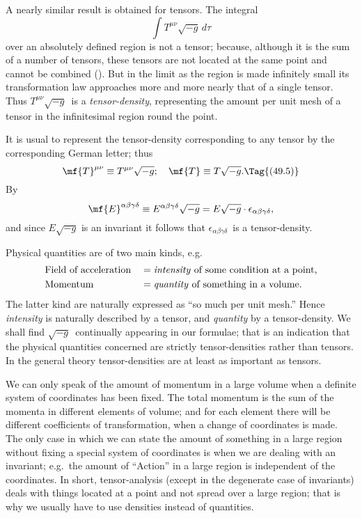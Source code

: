 \documentclass[12pt]{book}
\begin{document}
A nearly similar result is obtained for tensors. The integral
\[
\int T^{\mu\nu} \sqrt{-g}\, d\tau
\]
over an absolutely defined region is not a tensor; because, although it is the
sum of a number of tensors, these tensors are not located at the same point
and cannot be combined (). But in the limit as the region is made
infinitely small its transformation law approaches more and more nearly that
of a single tensor. Thus $T^{\mu\nu} \sqrt{-g}$~is a \emph{tensor-density}, representing the amount
%
per unit mesh of a tensor in the infinitesimal region round the point.

It is usual to represent the tensor-density corresponding to any tensor by
%
the corresponding German letter; thus
\[
\mf{T}^{\mu\nu} \equiv T^{\mu\nu} \sqrt{-g};\quad
\mf{T} \equiv T \sqrt{-g}.
\Tag{(49.5)}
\]
By 
\[
\mf{E}^{\alpha\beta\gamma\delta} \equiv E^{\alpha\beta\gamma\delta} \sqrt{-g}
= E \sqrt{-g} \cdot \epsilon_{\alpha\beta\gamma\delta},
\]
and since $E \sqrt{-g}$ is an invariant it follows that $\epsilon_{\alpha\beta\gamma\delta}$~is a tensor-density.

Physical quantities are of two main kinds, e.g.\
%
%
\begin{alignat*}{2}
  &\text{Field of acceleration}
  &&= \text{\emph{intensity} of some condition at a point,} \\
    &\text{Momentum}
    &&= \text{\emph{quantity} of something in a volume.}
\end{alignat*}
The latter kind are naturally expressed as ``so much per unit mesh.'' Hence
\emph{intensity} is naturally described by a tensor, and \emph{quantity} by a tensor-density.
We shall find $\sqrt{-g}$~continually appearing in our formulae; that is an indication
that the physical quantities concerned are strictly tensor-densities rather
than tensors. In the general theory tensor-densities are at least as important
as tensors.

We can only speak of the amount of momentum in a large volume when
a definite system of coordinates has been fixed. The total momentum is the
sum of the momenta in different elements of volume; and for each element
there will be different coefficients of transformation, when a change of coordinates
is made. The only case in which we can state the amount of something
in a large region without fixing a special system of coordinates is when we
are dealing with an invariant; e.g.\ the amount of ``Action'' in a large region
is independent of the coordinates. In short, tensor-analysis (except in the
degenerate case of invariants) deals with things located at a point and not
spread over a large region; that is why we usually have to use densities
instead of quantities.
\end{document}
